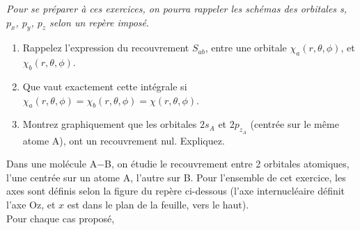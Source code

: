 

\textit{Pour se pr\'eparer \`a ces exercices, on pourra rappeler les sch\'emas des orbitales s, $p_x$, $p_y$, $p_z$ selon un rep\`ere impos\'e}.


\begin{enumerate}[\bf 1)]
\item   Rappelez l'expression du recouvrement $S_{ab}$, entre une orbitale $ \chi_a(r,\theta,\phi)$, et  $\chi_b(r,\theta,\phi)$.
\item  Que vaut exactement cette int\'egrale si $ \chi_a(r,\theta,\phi)=\chi_b(r,\theta,\phi)=\chi(r,\theta,\phi)$.
\item    Montrez graphiquement que les orbitales $2s_A$ et $2p_{z_{A}}$ (centr\'ee sur le m\^eme atome A), ont un recouvrement nul. Expliquez.
\end{enumerate} %
\label{exo_s}
Dans une mol\'ecule A$-$B, on \'etudie le recouvrement entre 2 orbitales atomiques, l'une centr\'ee sur un atome A, l'autre sur  B. Pour l'ensemble de cet exercice, les axes sont d\'efinis selon la figure du rep\`ere ci-dessous (l'axe internucl\'eaire d\'efinit l'axe Oz, et $x$ est dans le plan de la feuille, vers le haut). 
\\

Pour chaque cas propos\'e,

